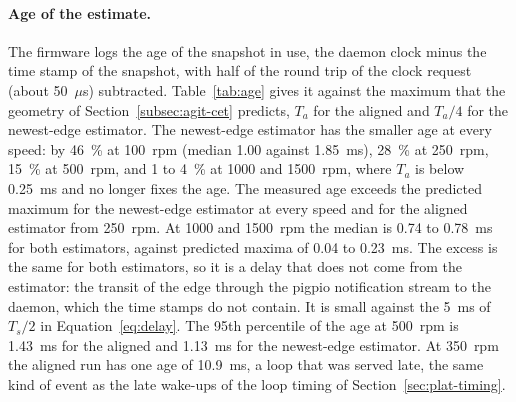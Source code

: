 \begin{table}[htbp]
    \centering
    \caption[Bias of each estimator against the index pulses]{Bias of the mean speed of each estimator against the speed from the index pulses, over the steps above 100~rpm. Tests: A, open loop; Bold, closed loop with the earlier gains; Bimc, closed loop with the gains from the identified plant. ``Steps'' is the number of steps analysed; the bias is in percent of the speed except the last column (rpm).}
    \label{tab:est-acc}
    \small
    \resizebox{\textwidth}{!}{}
\end{table}

\paragraph{Age of the estimate.}
The firmware logs the age of the snapshot in use, the daemon clock minus the time stamp of the snapshot, with half of the round trip of the clock request (about 50~$\mu$s) subtracted. Table~\ref{tab:age} gives it against the maximum that the geometry of Section~\ref{subsec:agit-cet} predicts, $T_a$ for the aligned and $T_a/4$ for the newest-edge estimator. The newest-edge estimator has the smaller age at every speed: by 46~\% at 100~rpm (median 1.00 against 1.85~ms), 28~\% at 250~rpm, 15~\% at 500~rpm, and 1 to 4~\% at 1000 and 1500~rpm, where $T_a$ is below 0.25~ms and no longer fixes the age. The measured age exceeds the predicted maximum for the newest-edge estimator at every speed and for the aligned estimator from 250~rpm. At 1000 and 1500~rpm the median is 0.74 to 0.78~ms for both estimators, against predicted maxima of 0.04 to 0.23~ms. The excess is the same for both estimators, so it is a delay that does not come from the estimator: the transit of the edge through the pigpio notification stream to the daemon, which the time stamps do not contain. It is small against the 5~ms of $T_s/2$ in Equation~\ref{eq:delay}. The 95th percentile of the age at 500~rpm is 1.43~ms for the aligned and 1.13~ms for the newest-edge estimator. At 350~rpm the aligned run has one age of 10.9~ms, a loop that was served late, the same kind of event as the late wake-ups of the loop timing of Section~\ref{sec:plat-timing}.

\begin{table}[htbp]
    \centering
    \caption[Measured age of the speed estimate]{Age of the snapshot in use (microseconds) for the two CET estimators, from the log of the daemon. The prediction is the maximum of the geometric argument of Section~\ref{subsec:agit-cet}, and the aligned period is $T_a = 60\times10^{6}/(256\,n)$~$\mu$s. ``rtt'' is the round trip of the clock request.}
    \label{tab:age}
    \small
    \resizebox{\textwidth}{!}{}
\end{table}

